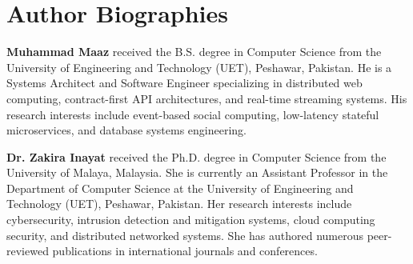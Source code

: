 \documentclass[conference]{IEEEtran}
\begin{document}
\section*{Author Biographies}
\textbf{Muhammad Maaz} received the B.S. degree in Computer Science from the University of Engineering and Technology (UET), Peshawar, Pakistan. He is a Systems Architect and Software Engineer specializing in distributed web computing, contract-first API architectures, and real-time streaming systems. His research interests include event-based social computing, low-latency stateful microservices, and database systems engineering.

\vspace{1ex}
\textbf{Dr. Zakira Inayat} received the Ph.D. degree in Computer Science from the University of Malaya, Malaysia. She is currently an Assistant Professor in the Department of Computer Science at the University of Engineering and Technology (UET), Peshawar, Pakistan. Her research interests include cybersecurity, intrusion detection and mitigation systems, cloud computing security, and distributed networked systems. She has authored numerous peer-reviewed publications in international journals and conferences.



\end{document}
